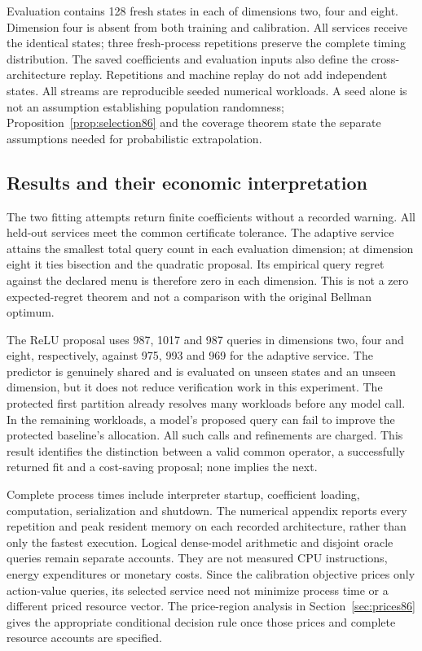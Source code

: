 Evaluation contains 128 fresh states in each of dimensions two, four and eight. Dimension four is absent from both training and calibration. All services receive the identical states; three fresh-process repetitions preserve the complete timing distribution. The saved coefficients and evaluation inputs also define the cross-architecture replay. Repetitions and machine replay do not add independent states. All streams are reproducible seeded numerical workloads. A seed alone is not an assumption establishing population randomness; Proposition~\ref{prop:selection86} and the coverage theorem state the separate assumptions needed for probabilistic extrapolation.



\subsection{Results and their economic interpretation}
The two fitting attempts return finite coefficients without a recorded warning. All held-out services meet the common certificate tolerance. The adaptive service attains the smallest total query count in each evaluation dimension; at dimension eight it ties bisection and the quadratic proposal. Its empirical query regret against the declared menu is therefore zero in each dimension. This is not a zero expected-regret theorem and not a comparison with the original Bellman optimum.

The ReLU proposal uses 987, 1017 and 987 queries in dimensions two, four and eight, respectively, against 975, 993 and 969 for the adaptive service. The predictor is genuinely shared and is evaluated on unseen states and an unseen dimension, but it does not reduce verification work in this experiment. The protected first partition already resolves many workloads before any model call. In the remaining workloads, a model's proposed query can fail to improve the protected baseline's allocation. All such calls and refinements are charged. This result identifies the distinction between a valid common operator, a successfully returned fit and a cost-saving proposal; none implies the next.

Complete process times include interpreter startup, coefficient loading, computation, serialization and shutdown. The numerical appendix reports every repetition and peak resident memory on each recorded architecture, rather than only the fastest execution. Logical dense-model arithmetic and disjoint oracle queries remain separate accounts. They are not measured CPU instructions, energy expenditures or monetary costs. Since the calibration objective prices only action-value queries, its selected service need not minimize process time or a different priced resource vector. The price-region analysis in Section~\ref{sec:prices86} gives the appropriate conditional decision rule once those prices and complete resource accounts are specified.

